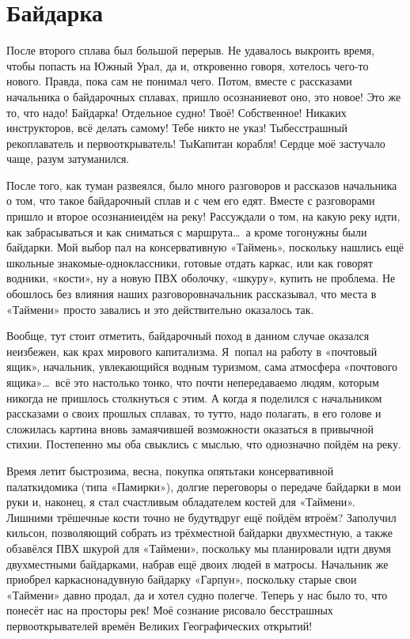 \chapter{Байдарка}

После второго сплава был большой перерыв. Не удавалось выкроить время, чтобы попасть на Южный Урал, да и, откровенно говоря, хотелось чего-то нового. Правда, пока сам не понимал чего. Потом, вместе с рассказами начальника о байдарочных сплавах, пришло осознание\mdash вот оно, это новое! Это же то, что надо! Байдарка! Отдельное судно! Твоё! Собственное! Никаких инструкторов, всё делать самому! Тебе никто не указ! Ты\mdash бесстрашный рекоплаватель и первооткрыватель! Ты\mdash Капитан корабля! Сердце моё застучало чаще, разум затуманился. 

После того, как туман развеялся, было много разговоров и рассказов начальника о том, что такое байдарочный сплав и с чем его едят. Вместе с разговорами пришло и второе осознание\mdash идём на реку! Рассуждали о том, на какую реку идти, как забрасываться и как сниматься с маршрута\ldots~а кроме того\mdash нужны были байдарки. Мой выбор пал на консервативную «Таймень», поскольку нашлись ещё школьные знакомые-одноклассники, готовые отдать каркас, или как говорят водники, «кости», ну а новую ПВХ оболочку, «шкуру», купить не проблема. Не обошлось без влияния наших разговоров\mdash начальник рассказывал, что места в «Таймени» просто завались и это действительно оказалось так.

Вообще, тут стоит отметить, байдарочный поход в данном случае оказался неизбежен, как крах мирового капитализма. Я~попал на работу в «почтовый ящик», начальник, увлекающийся водным туризмом, сама атмосфера «почтового ящика»\ldots~всё это настолько тонко, что почти непередаваемо людям, которым никогда не пришлось столкнуться с этим. А когда я поделился с начальником рассказами о своих прошлых сплавах, то тут\sdash то, надо полагать, в его голове и сложилась картина вновь замаячившей возможности оказаться в привычной стихии. Постепенно мы оба свыклись с мыслью, что однозначно пойдём на реку.

Время летит быстро\mdash зима, весна, покупка опять\sdash таки консервативной палатки\sdash домика (типа «Памирки»), долгие переговоры о передаче байдарки в мои руки и, наконец, я стал счастливым обладателем костей для «Таймени». Лишними трёшечные кости точно не будут\mdash вдруг ещё пойдём втроём? Заполучил кильсон, позволяющий собрать из трёхместной байдарки двухместную, а также обзавёлся ПВХ шкурой для «Таймени», поскольку мы планировали идти двумя двухместными байдарками, набрав ещё двоих людей в матросы. Начальник же приобрел каркасно\sdash надувную байдарку «Гарпун», поскольку старые свои «Таймени» давно продал, да и хотел судно полегче. Теперь у нас было то, что понесёт нас на просторы рек! Моё сознание рисовало бесстрашных первооткрывателей времён Великих Географических открытий!


